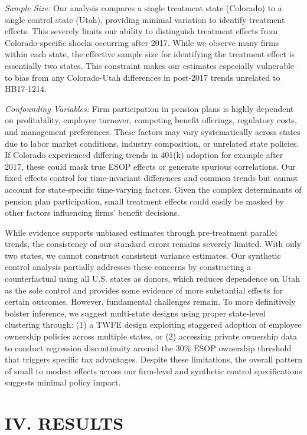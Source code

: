 \documentclass[12pt]{article}
\renewcommand{\normalsize}{\fontsize{12pt}{14pt}\selectfont}
\begin{document}
\textit{Sample Size:} Our analysis compares a single treatment state (Colorado) to a single control state (Utah), providing minimal variation to identify treatment effects. This severely limits our ability to distinguish treatment effects from Colorado-specific shocks occurring after 2017. While we observe many firms within each state, the effective sample size for identifying the treatment effect is essentially two states. This constraint makes our estimates especially vulnerable to bias from any Colorado-Utah differences in post-2017 trends unrelated to HB17-1214.

\textit{Confounding Variables:} Firm participation in pension plans is highly dependent on profitability, employee turnover, competing benefit offerings, regulatory costs, and management preferences. These factors may vary systematically across states due to labor market conditions, industry composition, or unrelated state policies. If Colorado experienced differing trends in 401(k) adoption for example after 2017, these could mask true ESOP effects or generate spurious correlations. Our fixed effects control for time-invariant differences and common trends but cannot account for state-specific time-varying factors. Given the complex determinants of pension plan participation, small treatment effects could easily be masked by other factors influencing firms' benefit decisions.

While evidence supports unbiased estimates through pre-treatment parallel trends, the consistency of our standard errors remains severely limited. With only two states, we cannot construct consistent variance estimates. Our synthetic control analysis partially addresses these concerns by constructing a counterfactual using all U.S. states as donors, which reduces dependence on Utah as the sole control and provides some evidence of more substantial effects for certain outcomes. However, fundamental challenges remain. To more definitively bolster inference, we suggest multi-state designs using proper state-level clustering through: (1) a TWFE design exploiting staggered adoption of employee ownership policies across multiple states, or (2) accessing private ownership data to conduct regression discontinuity around the 30\% ESOP ownership threshold that triggers specific tax advantages. Despite these limitations, the overall pattern of small to modest effects across our firm-level and synthetic control specifications suggests minimal policy impact.

\section*{\centering \normalsize \textbf{IV. RESULTS}}
\end{document}
